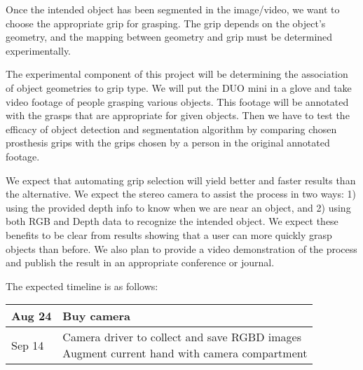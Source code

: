 \documentclass[12pt]{article}
\begin{document}
Once the intended object has been segmented in the image/video, we want to
choose the appropriate grip for grasping. The grip depends on the object’s
geometry, and the mapping between geometry and grip must be determined
experimentally. \newline

The experimental component of this project will be determining the association
of object geometries to grip type. We will put the DUO mini in a glove and take
video footage of people grasping various objects. This footage will be annotated
with the grasps that are appropriate for given objects. Then we have to test the
efficacy of object detection and segmentation algorithm by comparing chosen
prosthesis grips with the grips chosen by a person in the original annotated
footage. \newline

We expect that automating grip selection will yield better and faster results
than the alternative. We expect the stereo camera to assist the process in two
ways: 1) using the provided depth info to know when we are near an object, and
2) using both RGB and Depth data to recognize the intended object. We expect
these benefits to be clear from results showing that a user can more quickly
grasp objects than before. We also plan to provide a video demonstration of the
process and publish the result in an appropriate conference or journal. \newline

The expected timeline is as follows: \newline
\begin{tabular}{| l | l |}
\hline
Aug 24 & Buy camera \\ \hline
Sep 14 & \pbox{20cm}{Camera driver to collect and save RGBD images \\
                      Augment current hand with camera compartment  } \\ \hline

\hline
\end{tabular}
\end{document}

